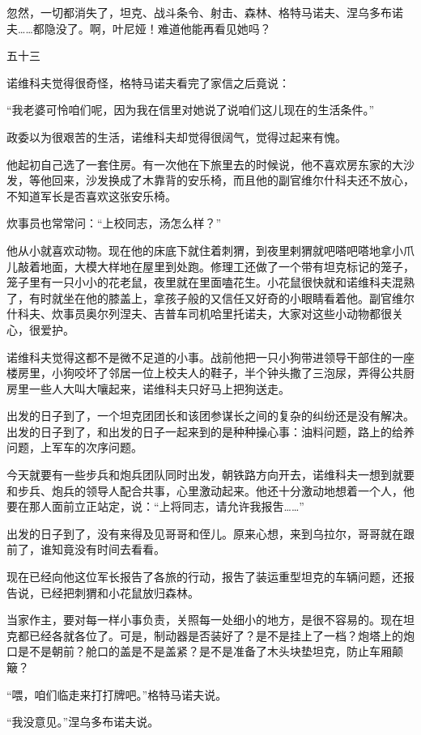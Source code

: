 忽然，一切都消失了，坦克、战斗条令、射击、森林、格特马诺夫、涅乌多布诺夫……都隐没了。啊，叶尼娅！难道他能再看见她吗？

五十三

诺维科夫觉得很奇怪，格特马诺夫看完了家信之后竟说：

“我老婆可怜咱们呢，因为我在信里对她说了说咱们这儿现在的生活条件。”

政委以为很艰苦的生活，诺维科夫却觉得很阔气，觉得过起来有愧。

他起初自己选了一套住房。有一次他在下旅里去的时候说，他不喜欢房东家的大沙发，等他回来，沙发换成了木靠背的安乐椅，而且他的副官维尔什科夫还不放心，不知道军长是否喜欢这张安乐椅。

炊事员也常常问：“上校同志，汤怎么样？”

他从小就喜欢动物。现在他的床底下就住着刺猬，到夜里剌猬就吧嗒吧嗒地拿小爪儿敲着地面，大模大样地在屋里到处跑。修理工还做了一个带有坦克标记的笼子，笼子里有一只小小的花老鼠，夜里就在里面嗑花生。小花鼠很快就和诺维科夫混熟了，有时就坐在他的膝盖上，拿孩子般的又信任又好奇的小眼睛看着他。副官维尔什科夫、炊事员奥尔列涅夫、吉普车司机哈里托诺夫，大家对这些小动物都很关心，很爱护。

诺维科夫觉得这都不是微不足道的小事。战前他把一只小狗带进领导干部住的一座楼房里，小狗咬坏了邻居一位上校夫人的鞋子，半个钟头撒了三泡尿，弄得公共厨房里一些人大叫大嚷起来，诺维科夫只好马上把狗送走。

出发的日子到了，一个坦克团团长和该团参谋长之间的复杂的纠纷还是没有解决。出发的日子到了，和出发的日子一起来到的是种种操心事：油料问题，路上的给养问题，上军车的次序问题。

今天就要有一些步兵和炮兵团队同时出发，朝铁路方向开去，诺维科夫一想到就要和步兵、炮兵的领导人配合共事，心里激动起来。他还十分激动地想着一个人，他要在那人面前立正站定，说：“上将同志，请允许我报吿……”

出发的日子到了，没有来得及见哥哥和侄儿。原来心想，来到乌拉尔，哥哥就在跟前了，谁知竟没有时间去看看。

现在已经向他这位军长报告了各旅的行动，报吿了装运重型坦克的车辆问题，还报告说，已经把刺猬和小花鼠放归森林。

当家作主，要对每一样小事负责，关照每一处细小的地方，是很不容易的。现在坦克都已经各就各位了。可是，制动器是否装好了？是不是挂上了一档？炮塔上的炮口是不是朝前？舱口的盖是不是盖紧？是不是准备了木头块垫坦克，防止车厢颠簸？

“喂，咱们临走来打打牌吧。”格特马诺夫说。

“我没意见。”涅乌多布诺夫说。

